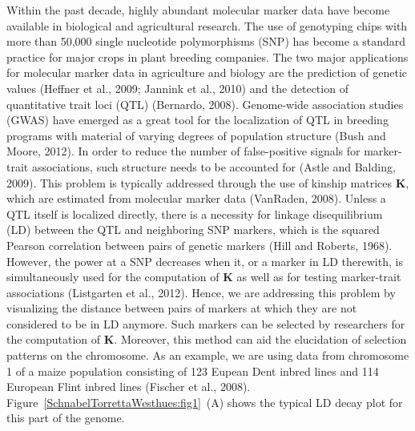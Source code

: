 \documentclass[twoside]{report}
\begin{document}
Within the past decade, highly abundant molecular marker data have become available in biological 
and agricultural research. The use of genotyping chips with more than 50,000 single nucleotide 
polymorphisms (SNP) has become a standard practice for major crops in plant breeding companies. 
The two major applications for molecular marker data in agriculture and biology are the prediction 
of genetic values (Heffner et al., 2009; Jannink et al., 2010) 
and the detection of quantitative trait loci (QTL) 
(Bernardo, 2008). Genome-wide association studies (GWAS) have emerged as a great tool for the 
localization of QTL in breeding programs with material of varying degrees of population structure
(Bush and Moore, 2012). 
In order to reduce the number of false-positive signals for marker-trait associations,
such structure needs to be accounted for (Astle and Balding, 2009). This problem is typically addressed through 
the use of kinship matrices \textbf{K}, which are estimated from molecular marker data 
(VanRaden, 2008).
Unless a QTL itself is localized directly, there is a necessity for linkage disequilibrium (LD) between
the QTL and neighboring SNP markers, which is the squared Pearson correlation between pairs of genetic
markers (Hill and Roberts, 1968). However, the power at a SNP decreases when it, 
or a marker in LD therewith,
is simultaneously used for the computation of \textbf{K} as well as for testing marker-trait 
associations (Listgarten et al., 2012). 
Hence, we are addressing this problem by visualizing the distance
between pairs of markers at which they are not considered to be in LD anymore. Such markers can be 
selected by researchers for the computation of \textbf{K}. Moreover, this method can aid 
the elucidation
of selection patterns on the chromosome. As an example, we are using data from chromosome 1 of a maize 
population consisting of 123 Eupean Dent inbred lines and 114 European Flint inbred lines
(Fischer et al., 2008). Figure~\ref{SchnabelTorrettaWesthues:fig1}~(A) shows the typical LD decay plot 
for this part of the genome. 
\end{document}
